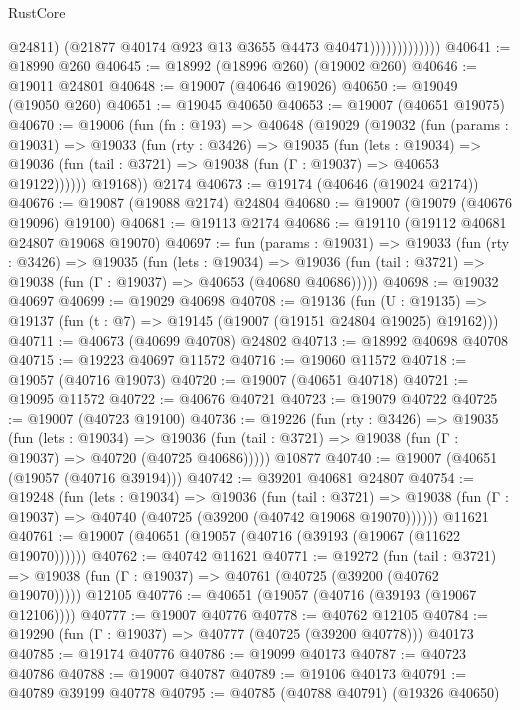 \begin{lexlean}{RustCore}
\begin{coremodule}
                              @24811)
                            (@21877 @40174 @923 @13 @3655 @4473 @40471)))))))))))))
@40641 := @18990 @260
@40645 := @18992 (@18996 @260) (@19002 @260)
@40646 := @19011 @24801
@40648 := @19007 (@40646 @19026)
@40650 := @19049 (@19050 @260)
@40651 := @19045 @40650
@40653 := @19007 (@40651 @19075)
@40670 := @19006
    (fun (fn : @193) =>
    @40648
      (@19029
        (@19032
          (fun (params : @19031) =>
          @19033
            (fun (rty : @3426) =>
            @19035
              (fun (lets : @19034) =>
              @19036 (fun (tail : @3721) => @19038 (fun (Γ : @19037) => @40653 @19122))))))
        @19168))
    @2174
@40673 := @19174 (@40646 (@19024 @2174))
@40676 := @19087 (@19088 @2174) @24804
@40680 := @19007 (@19079 (@40676 @19096) @19100)
@40681 := @19113 @2174
@40686 := @19110 (@19112 @40681 @24807 @19068 @19070)
@40697 := fun (params : @19031) =>
  @19033
    (fun (rty : @3426) =>
    @19035
      (fun (lets : @19034) =>
      @19036 (fun (tail : @3721) => @19038 (fun (Γ : @19037) => @40653 (@40680 @40686)))))
@40698 := @19032 @40697
@40699 := @19029 @40698
@40708 := @19136
    (fun (U : @19135) => @19137 (fun (t : @7) => @19145 (@19007 (@19151 @24804 @19025) @19162)))
@40711 := @40673 (@40699 @40708) @24802
@40713 := @18992 @40698 @40708
@40715 := @19223 @40697 @11572
@40716 := @19060 @11572
@40718 := @19057 (@40716 @19073)
@40720 := @19007 (@40651 @40718)
@40721 := @19095 @11572
@40722 := @40676 @40721
@40723 := @19079 @40722
@40725 := @19007 (@40723 @19100)
@40736 := @19226
    (fun (rty : @3426) =>
    @19035
      (fun (lets : @19034) =>
      @19036 (fun (tail : @3721) => @19038 (fun (Γ : @19037) => @40720 (@40725 @40686)))))
    @10877
@40740 := @19007 (@40651 (@19057 (@40716 @39194)))
@40742 := @39201 @40681 @24807
@40754 := @19248
    (fun (lets : @19034) =>
    @19036
      (fun (tail : @3721) =>
      @19038 (fun (Γ : @19037) => @40740 (@40725 (@39200 (@40742 @19068 @19070))))))
    @11621
@40761 := @19007 (@40651 (@19057 (@40716 (@39193 (@19067 (@11622 @19070))))))
@40762 := @40742 @11621
@40771 := @19272
    (fun (tail : @3721) => @19038 (fun (Γ : @19037) => @40761 (@40725 (@39200 (@40762 @19070)))))
    @12105
@40776 := @40651 (@19057 (@40716 (@39193 (@19067 @12106))))
@40777 := @19007 @40776
@40778 := @40762 @12105
@40784 := @19290 (fun (Γ : @19037) => @40777 (@40725 (@39200 @40778))) @40173
@40785 := @19174 @40776
@40786 := @19099 @40173
@40787 := @40723 @40786
@40788 := @19007 @40787
@40789 := @19106 @40173
@40791 := @40789 @39199 @40778
@40795 := @40785 (@40788 @40791) (@19326 @40650)

\end{coremodule}
\end{lexlean}
